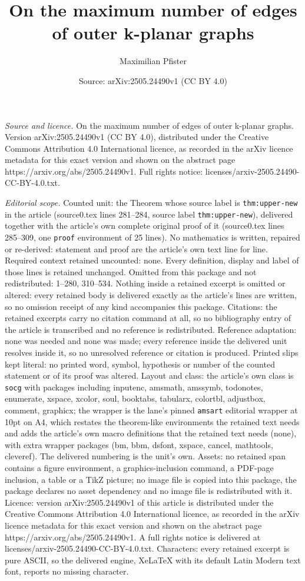 \documentclass[10pt,a4paper]{amsart}
\title[On the maximum number of edges of outer k-planar graphs]{On the maximum number of edges of outer k-planar graphs}
\author{Maximilian Pfister}
\date{Source: arXiv:2505.24490v1 (CC BY 4.0)}
\begin{document}
\maketitle

\noindent\emph{Source and licence.} On the maximum number of edges of outer k-planar graphs. Version arXiv:2505.24490v1 (CC BY 4.0), distributed under the Creative Commons Attribution 4.0 International licence, as recorded in the arXiv licence metadata for this exact version and shown on the abstract page https://arxiv.org/abs/2505.24490v1. Full rights notice: licenses/arxiv-2505.24490-CC-BY-4.0.txt.\par\smallskip

\noindent\textit{Editorial scope.} Counted unit: the Theorem whose source label is \texttt{thm:upper-new} in the article (source0.tex lines 281--284, source label \texttt{thm:upper-new}), delivered together with the article's own complete original proof of it (source0.tex lines 285--309, one \texttt{proof} environment of 25 lines). No mathematics is written, repaired or re-derived: statement and proof are the article's own text line for line. Required context retained uncounted: none. Every definition, display and label of those lines is retained unchanged. Omitted from this package and not redistributed: 1--280, 310--534. Nothing inside a retained excerpt is omitted or altered: every retained body is delivered exactly as the article's lines are written, so no omission receipt of any kind accompanies this package. Citations: the retained excerpts carry no citation command at all, so no bibliography entry of the article is transcribed and no reference is redistributed. Reference adaptation: none was needed and none was made; every reference inside the delivered unit resolves inside it, so no unresolved reference or citation is produced. Printed slips kept literal: no printed word, symbol, hypothesis or number of the counted statement or of its proof was altered. Layout and class: the article's own class is \texttt{socg} with packages including inputenc, amsmath, amssymb, todonotes, enumerate, xspace, xcolor, soul, booktabs, tabularx, colortbl, adjustbox, comment, graphicx; the wrapper is the lane's pinned \texttt{amsart} editorial wrapper at 10pt on A4, which restates the theorem-like environments the retained text needs and adds the article's own macro definitions that the retained text needs (none), with extra wrapper packages (bm, bbm, dsfont, xspace, cancel, mathtools, cleveref). The delivered numbering is the unit's own. Assets: no retained span contains a figure environment, a graphics-inclusion command, a PDF-page inclusion, a table or a TikZ picture; no image file is copied into this package, the package declares no asset dependency and no image file is redistributed with it. Licence: version arXiv:2505.24490v1 of this article is distributed under the Creative Commons Attribution 4.0 International licence, as recorded in the arXiv licence metadata for this exact version and shown on the abstract page https://arxiv.org/abs/2505.24490v1. A full rights notice is delivered at licenses/arxiv-2505.24490-CC-BY-4.0.txt. Characters: every retained excerpt is pure ASCII, so the delivered engine, XeLaTeX with its default Latin Modern text font, reports no missing character.
\end{document}
